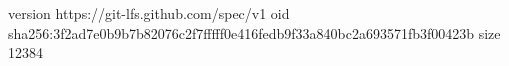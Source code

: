 version https://git-lfs.github.com/spec/v1
oid sha256:3f2ad7e0b9b7b82076c2f7fffff0e416fedb9f33a840bc2a693571fb3f00423b
size 12384
